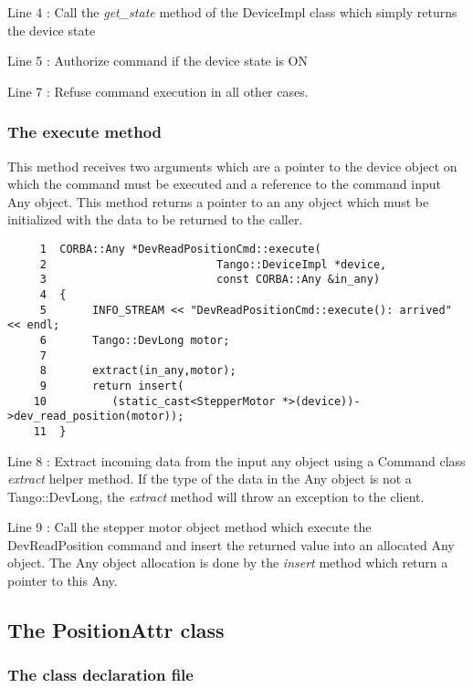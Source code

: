 Line 4 : Call the \emph{get\_state} method of the DeviceImpl class
which simply returns the device state

Line 5 : Authorize command if the device state is ON

Line 7 : Refuse command execution in all other cases. 


\subsubsection{The execute method}

This method receives two arguments which are a pointer to the device
object on which the command must be executed and a reference to the
command input Any object. This method returns a pointer to an any
object which must be initialized with the data to be returned to the
caller.


\begin{verbatim}
     1  CORBA::Any *DevReadPositionCmd::execute(
     2                          Tango::DeviceImpl *device,
     3                          const CORBA::Any &in_any)
     4  {       
     5       INFO_STREAM << "DevReadPositionCmd::execute(): arrived" << endl;
     6       Tango::DevLong motor;
     7  
     8       extract(in_any,motor);
     9       return insert(
    10          (static_cast<StepperMotor *>(device))->dev_read_position(motor));
    11  }
\end{verbatim}


Line 8 : Extract incoming data from the input any object using a Command
class \emph{extract} helper method. If the type of the data in the
Any object is not a Tango::DevLong, the \emph{extract}
method will throw an exception to the client.

Line 9 : Call the stepper motor object method which execute the DevReadPosition
command and insert the returned value into an allocated Any object.
The Any object allocation is done by the \emph{insert}
method which return a pointer to this Any.


\subsection{The PositionAttr class}


\subsubsection{The class declaration file}


